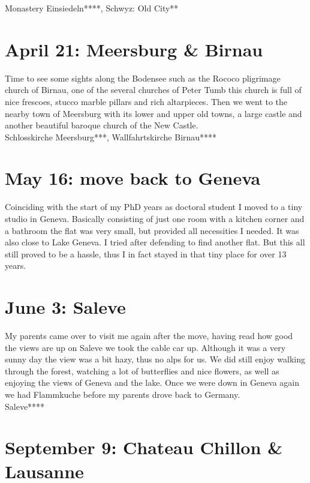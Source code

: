 Monastery Einsiedeln****, Schwyz: Old City**

\section{April 21: Meersburg \& Birnau}
\label{2007:Meersburg}

Time to see some sights along the Bodensee such as the Rococo pligrimage church of Birnau, one of the several churches of Peter Tumb this church is full of nice frescoes, stucco marble pillars and rich altarpieces. Then we went to the nearby town of Meersburg with its lower and upper old towns, a large castle and another beautiful baroque church of the New Castle.\\

Schlosskirche Meersburg***, Wallfahrtskirche Birnau****

\section{May 16: move back to Geneva}
\label{moveGeneva}

Coinciding with the start of my PhD years as doctoral student I moved to a tiny studio in Geneva. Basically consisting of just one room with a kitchen corner and a bathroom the flat was very small, but provided all necessities I needed. It was also close to Lake Geneva. I tried after defending to find another flat. But this all still proved to be a hassle, thus I in fact stayed in that tiny place for over 13 years.

\section{June 3: Saleve}
\label{2007:Saleve}

My parents came over to visit me again after the move, having read how good the views are up on Saleve we took the cable car up. Although it was a very sunny day the view was a bit hazy, thus no alps for us. We did still enjoy walking through the forest, watching a lot of butterflies and nice flowers, as well as enjoying the views of Geneva and the lake. Once we were down in Geneva again we had Flammkuche before my parents drove back to Germany.\\

Saleve****

\section{September 9: Chateau Chillon \& Lausanne}
\label{2007:Chillon}

